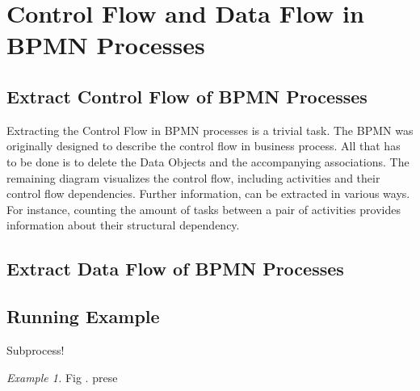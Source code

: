 

\section{Control Flow and Data Flow in BPMN Processes}
\label{ch:PrepApproach:ControlDataFlowBPMNProcess}

\subsection{Extract Control Flow of BPMN Processes}
Extracting the Control Flow in BPMN processes is a trivial task. The BPMN was originally designed to describe the control flow in business process. All that has to be done is to delete the Data Objects and the accompanying associations. The remaining diagram visualizes the control flow, including activities and their control flow dependencies. Further information, can be extracted in various ways. For instance, counting the amount of tasks between a pair of activities provides information about their structural dependency.

\subsection{Extract Data Flow of BPMN Processes}

\subsection{Running Example}


Subprocess!



\textit{Example 1.} Fig . prese








